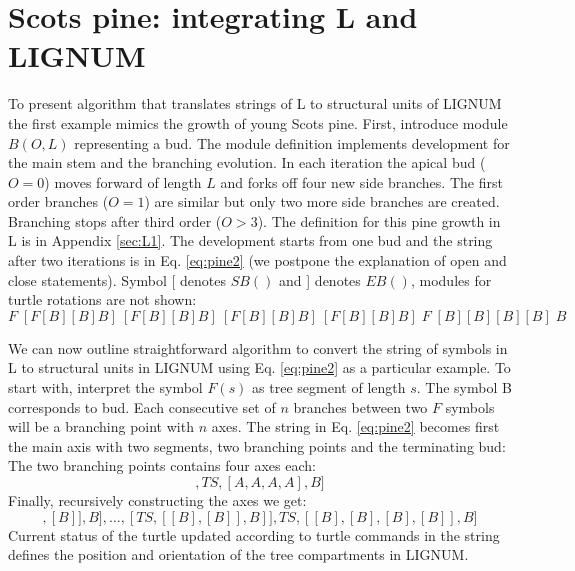 \section{Scots pine: integrating L and LIGNUM}\label{sec:pine}
To present algorithm that translates  strings of L to structural units
of LIGNUM  the first  example mimics the  growth of young  Scots pine.
First,  introduce  module $B(O,L)$  representing  a  bud.  The  module
definition implements development for  the main stem and the branching
evolution.  In each  iteration the apical bud ($O  = 0$) moves forward
of length $L$  and forks off four new side  branches.  The first order
branches ($O  = 1$) are  similar but only  two more side  branches are
created.  Branching stops after third order ($O > 3$).  The definition
for this pine growth in L is in Appendix \ref{sec:L1}. The development
starts from  one bud  and the  string after two  iterations is  in Eq.
\ref{eq:pine2}  (we  postpone  the   explanation  of  open  and  close
statements). Symbol [ denotes $SB()$ and ] denotes $EB()$, modules for
turtle rotations are not shown:
\begin{equation}\label{eq:pine2}
F\;[F[B][B]B]\:[F[B][B]B]\:[F[B][B]B]\:[F[B][B]B]\; F \;[B][B][B][B]\; B
\end{equation}

We can now outline straightforward  algorithm to convert the string of
symbols in L to structural units in LIGNUM using Eq. \ref{eq:pine2} as
a particular example.   To start with, interpret the  symbol $F(s)$ as
tree segment  of length $s$.  The  symbol B corresponds  to bud.  Each
consecutive  set of $n$  branches between  two $F$  symbols will  be a
branching  point with  $n$ axes.   The string  in  Eq.  \ref{eq:pine2}
becomes first  the main axis  with two segments, two  branching points
and the terminating bud:
\begin{equation}
[TS, BP, TS, BP, B]
\end{equation}
The two branching points contains four axes each:
\begin{equation}
[TS, [A,A,A,A], TS, [A,A,A,A], B]
\end{equation}
Finally, recursively constructing the axes we get:
\begin{equation}
[TS, [TS,[[B],[B]],B],\ldots, [TS,[[B],[B]],B]], TS, [[B],[B],[B],[B]], B]
\end{equation}
Current status of  the turtle updated according to  turtle commands in
the  string   defines  the  position  and  orientation   of  the  tree
compartments in LIGNUM.

